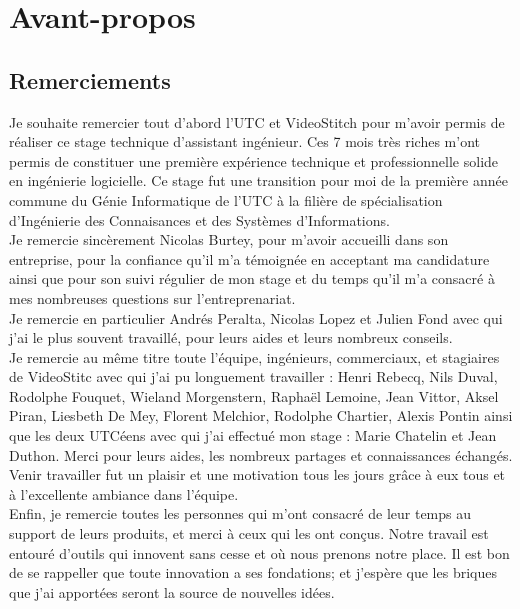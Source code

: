 \chapter*{Avant-propos}

\section*{Remerciements}
Je souhaite remercier tout d'abord l'UTC et VideoStitch pour m'avoir permis de 
réaliser ce stage technique d'assistant ingénieur. Ces 7 mois très riches m'ont 
permis de constituer une première expérience technique et professionnelle solide 
en ingénierie logicielle. Ce stage fut une transition pour moi de la première 
année commune du Génie Informatique de l'UTC à la filière de spécialisation 
d'Ingénierie des Connaisances et des Systèmes d'Informations.\\
\newline
Je remercie sincèrement Nicolas Burtey, pour m'avoir accueilli dans son entreprise,
pour la confiance qu'il m'a témoignée en acceptant ma candidature ainsi que pour
son suivi régulier de mon stage et du temps qu'il m'a consacré à mes nombreuses
questions sur l'entreprenariat.\\
Je remercie en particulier Andrés Peralta, Nicolas Lopez et Julien Fond avec qui 
j'ai le plus souvent travaillé, pour leurs aides et leurs nombreux conseils.\\
Je remercie au même titre toute l'équipe, ingénieurs, commerciaux, et stagiaires 
de VideoStitc avec qui j'ai pu longuement travailler :
Henri Rebecq, Nils Duval, Rodolphe Fouquet, Wieland Morgenstern, Raphaël 
Lemoine, Jean Vittor, Aksel Piran, Liesbeth De Mey, Florent Melchior, Rodolphe 
Chartier, Alexis Pontin ainsi que les deux UTCéens avec qui j'ai effectué mon 
stage : Marie Chatelin et Jean Duthon. Merci pour leurs aides, 
les nombreux partages et connaissances échangés. Venir travailler fut un plaisir 
et une motivation tous les jours grâce à eux tous et à l'excellente ambiance dans l'équipe.\\
\newline
Enfin, je remercie toutes les personnes qui m'ont consacré de leur temps au support 
de leurs produits, et merci à ceux qui les ont conçus. Notre travail est entouré 
d'outils qui innovent sans cesse et où nous prenons notre place. Il est bon de 
se rappeller que toute innovation a ses fondations; et j'espère que les briques 
que j'ai apportées seront la source de nouvelles idées.


